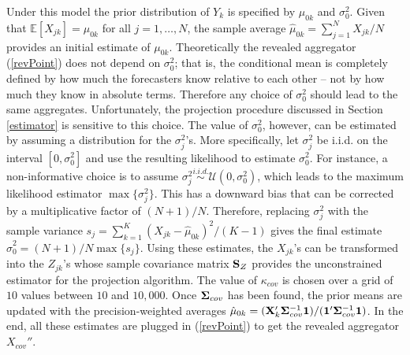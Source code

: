 \documentclass[11pt]{article}
\newcommand{\E}{\mathbb{E}}
\theoremstyle{definition}
\theoremstyle{definition}
\def\one{{\bf 1}}
\def\bSigma{{\bf \Sigma}}
\def\X{{\bf X}}
\def\SS{{\bf S}}
\def\E{{\mathbb E}}
\begin{document}
Under this model the prior distribution of $Y_k$ is specified by $\mu_{0k}$ and $\sigma_0^2$. Given that $\E[X_{jk}] = \mu_{0k}$ for all $j = 1, \dots, N$, the sample average $\hat{\mu}_{0k} = \sum_{j=1}^N X_{jk}/N$ provides an initial estimate of $\mu_{0k}$. Theoretically the revealed aggregator (\ref{revPoint}) does not depend on $\sigma_0^2$; that is, the conditional mean is completely defined by how much the forecasters know relative to each other -- not by how much they know in absolute terms. Therefore any choice of $\sigma_0^2$ should lead to the same aggregates. Unfortunately, the projection procedure discussed in Section \ref{estimator} is sensitive to this choice. The value of $\sigma_0^2$, however, can be estimated by assuming a distribution for the $\sigma_j^2$'s. More specifically, let $\sigma_j^2$ be i.i.d. on the interval $[0,\sigma_0^2]$ and use the resulting likelihood to estimate $\sigma_0^2$. For instance, a non-informative choice is to assume $\sigma_j^2 \stackrel{i.i.d.}{\sim} \mathcal{U}(0,\sigma_0^2)$, which leads to the maximum likelihood estimator $\max\{\sigma_j^2\}$. This has a downward bias that can be corrected by a multiplicative factor of $(N+1)/N$. Therefore, replacing $\sigma_j^2$ with the sample variance  $s_j = \sum_{k=1}^K (X_{jk}-\hat{\mu}_{0k})^2/(K-1)$ gives the final estimate $\hat{\sigma}_0^2 = (N+1)/N\max\{s_j\}$. Using these estimates, the $X_{jk}$'s can be transformed into the $Z_{jk}$'s whose sample covariance matrix $\SS_Z$ provides the unconstrained estimator for the projection algorithm.  The value of $\kappa_{cov}$ is chosen over a grid of $10$ values between $10$ and $10,000$. Once $\bSigma_{cov}$ has been found, the prior means are updated with the precision-weighted averages $\hat{\mu}_{0k} = (\X_{k}' \bSigma_{cov}^{-1} \one)/(\one' \bSigma_{cov}^{-1} \one)$. In the end, all these estimates are plugged in (\ref{revPoint}) to get the revealed aggregator $X_{cov}''$.
\end{document}

